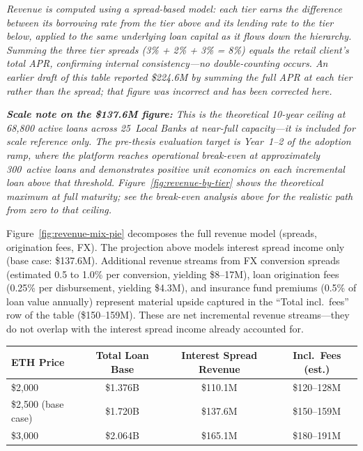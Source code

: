 \documentclass[12pt,a4paper]{report}
\newcommand{\tableheadcolor}{\rowcolor{TableHeadBg}}
\newcommand{\tableheadfont}{\bfseries}
\begin{document}
\vspace{2pt}
\noindent\textit{\small Revenue is computed using a \textit{spread-based} model: each tier earns the difference between its borrowing rate from the tier above and its lending rate to the tier below, applied to the same underlying loan capital as it flows down the hierarchy. Summing the three tier spreads (3\% + 2\% + 3\% = 8\%) equals the retail client's total APR, confirming internal consistency---no double-counting occurs. An earlier draft of this table reported \$224.6M by summing the full APR at each tier rather than the spread; that figure was incorrect and has been corrected here.}

\vspace{4pt}
\noindent\textit{\small \textbf{Scale note on the \$137.6M figure:} This is the theoretical 10-year ceiling at 68,800 active loans across 25~Local Banks at near-full capacity---it is included for scale reference only. The pre-thesis evaluation target is Year~1--2 of the adoption ramp, where the platform reaches operational break-even at approximately 300~active loans and demonstrates positive unit economics on each incremental loan above that threshold. Figure~\ref{fig:revenue-by-tier} shows the theoretical maximum at full maturity; see the break-even analysis above for the realistic path from zero to that ceiling.}

\vspace{4pt}
\noindent Figure~\ref{fig:revenue-mix-pie} decomposes the full revenue model (spreads, origination fees, FX). The projection above models interest spread income only (base case: \$137.6M). Additional revenue streams from FX conversion spreads (estimated 0.5 to 1.0\% per conversion, yielding \$8--17M), loan origination fees (0.25\% per disbursement, yielding \$4.3M), and insurance fund premiums (0.5\% of loan value annually) represent material upside captured in the ``Total incl.\ fees'' row of the table (\$150--159M). These are net incremental revenue streams---they do not overlap with the interest spread income already accounted for.

\begin{table}[H]
\centering
\begin{tabular}{@{}lccc@{}}
\toprule
\tableheadcolor
\tableheadfont ETH Price & \tableheadfont Total Loan Base & \tableheadfont Interest Spread Revenue & \tableheadfont Incl.\ Fees (est.) \\
\midrule
\$2{,}000 & \$1.376B & \$110.1M & \$120--128M \\
\rowcolor{RowShade}
\$2{,}500 (base case) & \$1.720B & \$137.6M & \$150--159M \\
\$3{,}000 & \$2.064B & \$165.1M & \$180--191M \\
\bottomrule
\end{tabular}
\end{table}
\end{document}
